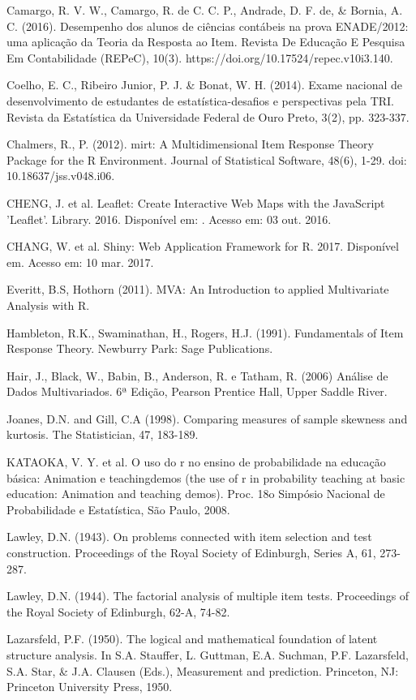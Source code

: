 \documentclass[12pt]{article}
\begin{document}
Camargo, R. V. W., Camargo, R. de C. C. P., Andrade, D. F. de, \& Bornia, A. C. (2016). Desempenho dos alunos de ciências contábeis na prova ENADE/2012: uma aplicação da Teoria da Resposta ao Item. Revista De Educação E Pesquisa Em Contabilidade (REPeC), 10(3). https://doi.org/10.17524/repec.v10i3.140.

Coelho, E. C., Ribeiro Junior, P. J. \& Bonat, W. H. (2014). Exame nacional de desenvolvimento de estudantes de estatística-desafios e perspectivas pela TRI. Revista da Estatística da Universidade Federal de Ouro Preto, 3(2), pp. 323-337.

\newpage
Chalmers, R., P. (2012). mirt: A Multidimensional Item Response Theory Package for the R Environment. Journal of Statistical Software, 48(6), 1-29. doi: 10.18637/jss.v048.i06.

CHENG, J. et al. Leaflet: Create Interactive Web Maps with the JavaScript ’Leaflet’. Library. 2016. Disponível em: . Acesso em: 03 out. 2016.

CHANG, W. et al. Shiny: Web Application Framework for R. 2017. Disponível em. Acesso em: 10 mar. 2017.

Everitt, B.S, Hothorn (2011). MVA: An Introduction to applied Multivariate Analysis with R.

Hambleton, R.K., Swaminathan, H., Rogers, H.J. (1991). Fundamentals of Item Response Theory. Newburry Park: Sage Publications.

Hair, J., Black, W., Babin, B., Anderson, R. e Tatham, R. (2006) Análise de Dados Multivariados. 6ª Edição, Pearson Prentice Hall, Upper Saddle River.

Joanes, D.N. and Gill, C.A (1998). Comparing measures of sample skewness and kurtosis. The Statistician, 47, 183-189.

KATAOKA, V. Y. et al. O uso do r no ensino de probabilidade na educação básica: Animation e teachingdemos (the use of r in probability teaching at basic education: Animation and teaching demos). Proc. 18o Simpósio Nacional de Probabilidade e Estatística, São Paulo, 2008.

Lawley, D.N. (1943). On problems connected with item selection and test construction. Proceedings of the Royal Society of Edinburgh, Series A, 61, 273-287. 

Lawley, D.N. (1944). The factorial analysis of multiple item tests. Proceedings of the Royal Society of Edinburgh, 62-A, 74-82. 

Lazarsfeld, P.F. (1950). The logical and mathematical foundation of latent structure analysis. In S.A. Stauffer, L. Guttman, E.A. Suchman, P.F. Lazarsfeld, S.A. Star, \& J.A. Clausen (Eds.), Measurement and prediction. Princeton, NJ: Princeton University Press, 1950.
\end{document}
